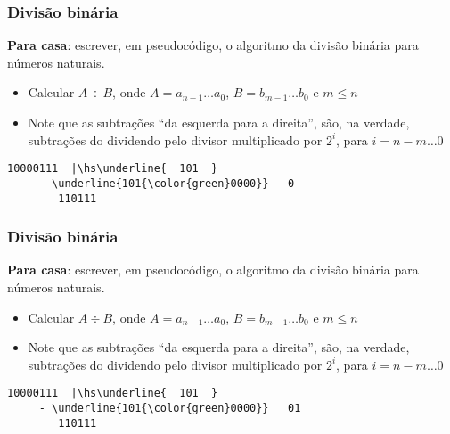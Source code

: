\documentclass{beamer}
\begin{document}

\begin{frame}[fragile]
\frametitle{Divisão binária}

\textbf{Para casa}: escrever, em pseudocódigo, o algoritmo da divisão binária para números naturais.

\begin{itemize}
\item Calcular $A \div B$, onde $A = a_{n-1} \ldots a_0$, $B = b_{m-1} \ldots b_0$ e $m \le n$
\item Note que as subtrações ``da esquerda para a direita'', são, na verdade, subtrações do dividendo pelo divisor multiplicado por $2^i$, para $i = n-m \ldots 0$
\end{itemize}

\def\hs{\hspace{-1mm}}

\begin{Verbatim}[commandchars=\\\{\},codes={\catcode`$=3\catcode`^=7}]
      10000111  |\hs\underline{  101  }
     - \underline{101{\color{green}0000}}   0
        110111 
\end{Verbatim}

\vspace{44pt}

\end{frame}


\begin{frame}[fragile]
\frametitle{Divisão binária}

\textbf{Para casa}: escrever, em pseudocódigo, o algoritmo da divisão binária para números naturais.

\begin{itemize}
\item Calcular $A \div B$, onde $A = a_{n-1} \ldots a_0$, $B = b_{m-1} \ldots b_0$ e $m \le n$
\item Note que as subtrações ``da esquerda para a direita'', são, na verdade, subtrações do dividendo pelo divisor multiplicado por $2^i$, para $i = n-m \ldots 0$
\end{itemize}

\def\hs{\hspace{-1mm}}

\begin{Verbatim}[commandchars=\\\{\},codes={\catcode`$=3\catcode`^=7}]
      10000111  |\hs\underline{  101  }
     - \underline{101{\color{green}0000}}   01
        110111 
\end{Verbatim}

\vspace{44pt}

\end{frame}
\end{document}
